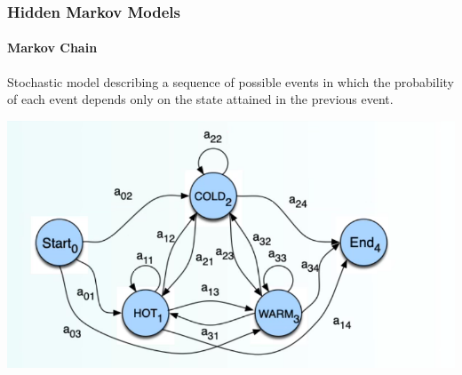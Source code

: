 \documentclass[10pt]{report}
\begin{document}
\subsubsection{Hidden Markov Models}
\paragraph{Markov Chain} Stochastic model describing a sequence of possible events in which the probability of each event depends only on the state attained in the previous event.
\begin{center}
	\includegraphics[scale=0.5]{12.png}
\end{center}
\end{document}
